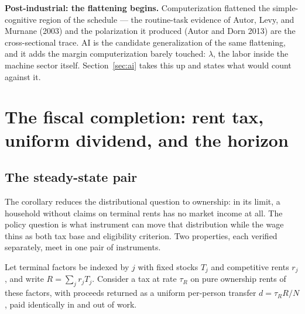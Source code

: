 \documentclass[12pt]{article}
\theoremstyle{plain}
\begin{document}
\textbf{Post-industrial: the flattening begins.} Computerization flattened the simple-cognitive region of the schedule --- the routine-task evidence of Autor, Levy, and Murnane (2003) and the polarization it produced (Autor and Dorn 2013) are the cross-sectional trace. AI is the candidate generalization of the same flattening, and it adds the margin computerization barely touched: $\lambda$, the labor inside the machine sector itself. Section~\ref{sec:ai} takes this up and states what would count against it.

\section{The fiscal completion: rent tax, uniform dividend, and the horizon}\label{sec:fiscal}

\subsection{The steady-state pair}\label{sec:fiscal-pair}

The corollary reduces the distributional question to ownership: in its limit, a household without claims on terminal rents has no market income at all. The policy question is what instrument can move that distribution while the wage thins as both tax base and eligibility criterion. Two properties, each verified separately, meet in one pair of instruments.

Let terminal factors be indexed by $j$ with fixed stocks $T_j$ and competitive rents $r_j$, and write $R = \sum _j r_j T_j$. Consider a tax at rate $\tau _R$ on pure ownership rents of these factors, with proceeds returned as a uniform per-person transfer $d = \tau _R R/N$, paid identically in and out of work.
\end{document}
